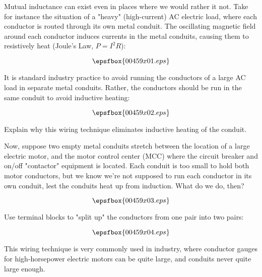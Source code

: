 

Mutual inductance can exist even in places where we would rather it not.  Take for instance the situation of a "heavy" (high-current) AC electric load, where each conductor is routed through its own metal conduit.  The oscillating magnetic field around each conductor induces currents in the metal conduits, causing them to resistively heat (Joule's Law, $P = I^2 R$):

$$\epsfbox{00459x01.eps}$$

It is standard industry practice to avoid running the conductors of a large AC load in separate metal conduits.  Rather, the conductors should be run in the same conduit to avoid inductive heating:

$$\epsfbox{00459x02.eps}$$

Explain why this wiring technique eliminates inductive heating of the conduit.

\vskip 10pt

Now, suppose two empty metal conduits stretch between the location of a large electric motor, and the motor control center (MCC) where the circuit breaker and on/off "contactor" equipment is located.  Each conduit is too small to hold both motor conductors, but we know we're not supposed to run each conductor in its own conduit, lest the conduits heat up from induction.  What do we do, then?

$$\epsfbox{00459x03.eps}$$







Use terminal blocks to "split up" the conductors from one pair into two pairs:

$$\epsfbox{00459x04.eps}$$







This wiring technique is very commonly used in industry, where conductor gauges for high-horsepower electric motors can be quite large, and conduits never quite large enough.




